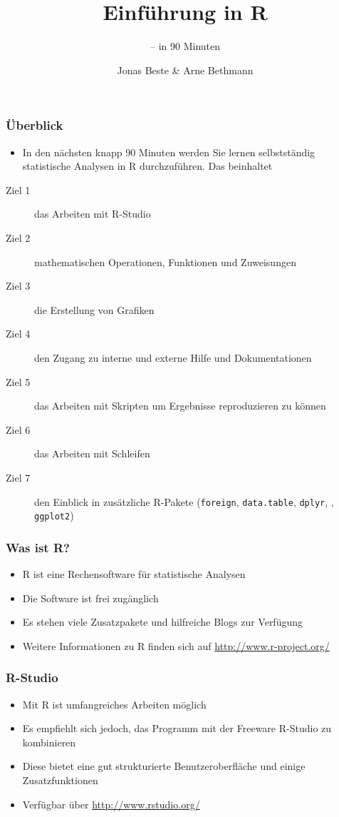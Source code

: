 \documentclass{beamer}
\title{Einführung in R}
\subtitle{-- in 90 Minuten}
\author{Jonas Beste \& Arne Bethmann}
\begin{document}
\begin{frame}
  \titlepage
\end{frame}

\begin{frame}
  \frametitle{Überblick}
  \begin{itemize}
    \item In den nächsten knapp 90 Minuten werden Sie lernen 
      selbstständig statistische Analysen in R durchzuführen. Das 
      beinhaltet
  \end{itemize}
  \begin{description}
    \item[Ziel 1] das Arbeiten mit R-Studio
    \item[Ziel 2] mathematischen Operationen, Funktionen und Zuweisungen
    \item[Ziel 3] die Erstellung von Grafiken
    \item[Ziel 4] den Zugang zu interne und externe Hilfe und Dokumentationen
    \item[Ziel 5] das Arbeiten mit Skripten um Ergebnisse reproduzieren zu können
    \item[Ziel 6] das Arbeiten mit Schleifen
    \item[Ziel 7] den Einblick in zusätzliche R-Pakete (\Verb+foreign+, \Verb+data.table+, \Verb+dplyr+, , \Verb+ggplot2+)
  \end{description}
\end{frame}

\begin{frame}
  \frametitle{Was ist R?}
  \begin{itemize}
    \item R ist eine Rechensoftware für statistische Analysen
    \item Die Software ist frei zugänglich   
    \item Es stehen viele Zusatzpakete und hilfreiche Blogs zur Verfügung  
    \item Weitere Informationen zu R finden sich auf \url{http://www.r-project.org/}
  \end{itemize}
\end{frame}

\begin{frame}
  \frametitle{R-Studio}
  \begin{itemize}
    \item Mit R ist umfangreiches Arbeiten möglich
    \item Es empfiehlt sich jedoch, das Programm mit der Freeware R-Studio zu kombinieren
    \item Diese bietet eine gut strukturierte Benutzeroberfläche und einige Zusatzfunktionen     
    \item Verfügbar über \url{http://www.rstudio.org/}
  \end{itemize}
\end{frame}
\end{document}
